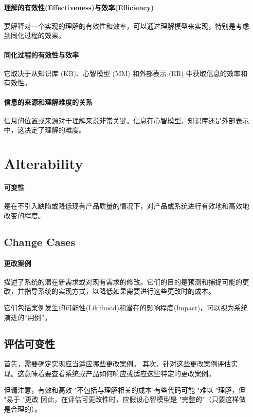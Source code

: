 \paragraph{理解的有效性(Effectiveness)与效率(Efficiency)}要解释对一个实现的理解的有效性和效率，可以通过理解模型来实现，特别是考虑到同化过程的效果。

\paragraph{同化过程的有效性与效率}它取决于从知识库 (KB)、心智模型 (MM) 和外部表示 (ER) 中获取信息的效率和有效性。

\paragraph{信息的来源和理解难度的关系}信息的位置或来源对于理解来说非常关键。信息在心智模型、知识库还是外部表示中，这决定了理解的难度。

\section{Alterability}
\paragraph{可变性}是在不引入缺陷或降低现有产品质量的情况下，对产品或系统进行有效地和高效地改变的程度。

\subsection{Change Cases}
\paragraph{更改案例}描述了系统的潜在新需求或对现有需求的修改。它们的目的是预测和捕捉可能的更改，并指导系统的实现方式，以降低如果需要进行这些更改时的成本。

它们包括案例发生的可能性(Liklihood)和潜在的影响程度(Impact)，可以视为系统演进的“用例”。

\subsection{评估可变性}
首先，需要确定实现应当适应哪些更改案例。
其次，针对这些更改案例评估实现。这意味着要查看系统或产品如何响应或适应这些特定的更改案例。

但请注意，有效和高效 "不包括与理解相关的成本
有些代码可能 "难以 "理解，但 "易于 "更改
因此，在评估可更改性时，应假设心智模型是 "完整的"（只要这样做是合理的）。

